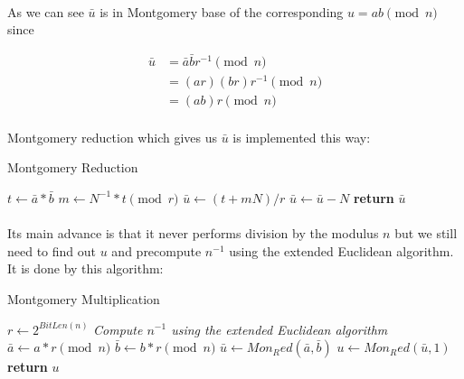 \documentclass[thesis=B,english]{FITthesis}[2012/10/20]
\begin{document}
{\paragraph*{}{
As we can see \(\bar{u}\) is in Montgomery base of the corresponding 
\(u = ab \pmod{n}\) 
since}

\begin{equation}
\begin{split}
\bar{u} & = \bar{a}\bar{b}r^{-1} \pmod{n} \\
 & = (ar)(br)r^{-1} \pmod{n} \\
 & = (ab)r \pmod{n}
\end{split}
\end{equation}
\medskip

\paragraph*{}{
Montgomery reduction which gives us \(\bar{u}\) is implemented this way:
}

\begin{algorithm}[H]
\caption{Montgomery Reduction}
\begin{algorithmic}[1]
 \State $t \gets\bar{a} *\bar{b}$
 \State $m \gets N^{-1} * t \pmod{r}$
 \State $\bar{u} \gets (t + mN) / r$
  \State $\bar{u} \gets\bar{u} - N$
 \EndIf
\State \textbf{return} $\bar{u}$
\EndFunction
\end{algorithmic}
\end{algorithm}

\paragraph*{}
{
Its main advance is that it never performs division by the modulus \(n\) but we still need to find out \(u\) and precompute \(n^{-1}\) using the extended Euclidean algorithm.
It is done by this algorithm: }

\begin{algorithm}[H]
\caption{Montgomery Multiplication}
\begin{algorithmic}[1]
 \State $r \gets 2^{BitLen(n)}$
 \State \textit{Compute \(n^{-1}\) using the extended Euclidean algorithm}
 \State $\bar{a} \gets a *r \pmod{n}$
 \State $\bar{b} \gets b * r \pmod{n}$
 \State $\bar{u} \gets Mon_Red(\bar{a}, \bar{b})$
 \State $u \gets Mon_Red(\bar{u}, 1)$
 \State \textbf{return} $u$
\EndFunction
\end{algorithmic}
\end{algorithm}

}
\end{document}
